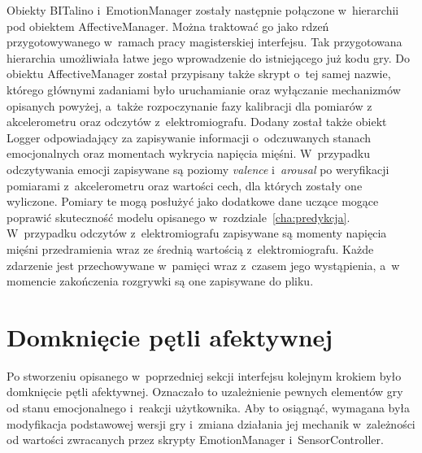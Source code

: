 Obiekty BITalino i~EmotionManager zostały następnie połączone w~hierarchii pod obiektem AffectiveManager. Można traktować go jako rdzeń przygotowywanego w~ramach pracy magisterskiej interfejsu. Tak przygotowana hierarchia umożliwiała łatwe jego wprowadzenie do istniejącego już kodu gry. Do obiektu AffectiveManager został przypisany także skrypt o~tej samej nazwie, którego głównymi zadaniami było uruchamianie oraz wyłączanie mechanizmów opisanych powyżej, a~także rozpoczynanie fazy kalibracji dla pomiarów z akcelerometru oraz odczytów z~elektromiografu. Dodany został także obiekt Logger odpowiadający za zapisywanie informacji o~odczuwanych stanach emocjonalnych oraz momentach wykrycia napięcia mięśni. W~przypadku odczytywania emocji zapisywane są poziomy \textit{valence} i~\textit{arousal} po weryfikacji pomiarami z~akcelerometru oraz wartości cech, dla których zostały one wyliczone. Pomiary te mogą posłużyć jako dodatkowe dane uczące mogące poprawić skuteczność modelu opisanego w~rozdziale~\ref{cha:predykcja}. W~przypadku odczytów z~elektromiografu zapisywane są momenty napięcia mięśni przedramienia wraz ze średnią wartością z~elektromiografu. Każde zdarzenie jest przechowywane w~pamięci wraz z~czasem jego wystąpienia, a~w momencie zakończenia rozgrywki są one zapisywane do pliku.

\section{Domknięcie pętli afektywnej}
Po stworzeniu opisanego w~poprzedniej sekcji interfejsu kolejnym krokiem było domknięcie pętli afektywnej. Oznaczało to uzależnienie pewnych elementów gry od stanu emocjonalnego i~reakcji użytkownika. Aby to osiągnąć, wymagana była modyfikacja podstawowej wersji gry i~zmiana działania jej mechanik w~zależności od wartości zwracanych przez skrypty EmotionManager i~SensorController.

